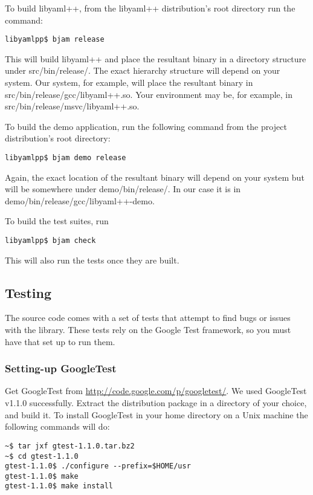 \documentclass{article}
\begin{document}
To build libyaml++, from the libyaml++ distribution's root directory run the
command:

\begin{verbatim}
libyamlpp$ bjam release
\end{verbatim}

This will build libyaml++ and place the resultant binary in a directory
structure under src/bin/release/.  The exact hierarchy structure will depend on
your system.  Our system, for example, will place the resultant binary in
src/bin/release/gcc/libyaml++.so.  Your environment may be, for example, in
src/bin/release/msvc/libyaml++.so.

To build the demo application, run the following command from the project
distribution's root directory:

\begin{verbatim}
libyamlpp$ bjam demo release
\end{verbatim}

Again, the exact location of the resultant binary will depend on your system
but will be somewhere under demo/bin/release/.  In our case it is in
demo/bin/release/gcc/libyaml++-demo.

To build the test suites, run

\begin{verbatim}
libyamlpp$ bjam check
\end{verbatim}

This will also run the tests once they are built.

\subsection{Testing}

The source code comes with a set of tests that attempt to find bugs or issues
with the library.  These tests rely on the Google Test framework, so you must
have that set up to run them.

\subsubsection{Setting-up GoogleTest}

Get GoogleTest from \url{http://code.google.com/p/googletest/}.  We used GoogleTest
v1.1.0 successfully.  Extract the distribution package in a directory of your
choice, and build it.  To install GoogleTest in your home directory on a Unix
machine the following commands will do:

\begin{verbatim}
~$ tar jxf gtest-1.1.0.tar.bz2
~$ cd gtest-1.1.0
gtest-1.1.0$ ./configure --prefix=$HOME/usr
gtest-1.1.0$ make
gtest-1.1.0$ make install
\end{verbatim}
\end{document}
